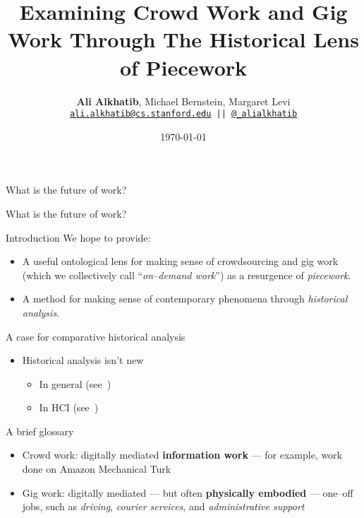 \documentclass{beamer}
\title{Examining Crowd Work and Gig Work Through The Historical Lens of Piecework}
\author{\textbf{Ali Alkhatib},
                Michael Bernstein,
                Margaret Levi\\
\texttt{ \scriptsize{\href{mailto:ali.alkhatib@cs.stanford.edu}{ali.alkhatib@cs.stanford.edu} ||
         \href{http://twitter.com/_alialkhatib}{@\_alialkhatib}} }}
\institute[Stanford]{Stanford University}
\date{\today}
\newcommand{\onlyinsubfile}[1]{#1}
\begin{document}
\renewcommand{\onlyinsubfile}[1]{}
\begin{frame}
\titlepage
\end{frame}




\begin{frame}[standout]
    What is the future of work?
\end{frame}

\begin{frame}{What is the future of work?}
    
\end{frame}

\begin{frame}{Introduction}
  We hope to provide:
      \begin{itemize}
        \item A useful ontological lens for making sense of crowdsourcing and gig work (which we collectively call ``\textit{on--demand work}'') as a resurgence of \textit{piecework}.
        \item A method for making sense of contemporary phenomena through \textit{historical analysis}.
      \end{itemize}
\end{frame}

\begin{frame}{A case for comparative historical analysis}
\begin{itemize}
  \item Historical analysis isn't new
  \begin{itemize}
    \item In general (see~\textcite{rosenberg1994exploring,rosenberg1982inside})
    \item In HCI (see~\textcite{Wyche2006,bodker1993historical})
  \end{itemize}
\end{itemize}
\end{frame}

\begin{frame}{A brief glossary}
    \begin{itemize}
      \item Crowd work: digitally mediated \textbf{information work}
      --- for example, work done on Amazon Mechanical Turk~\cite{crowdworkFuture}
      \item Gig work: digitally mediated --- but often \textbf{physically embodied} --- one--off jobs,
      such as
      \textit{driving},
      \textit{courier services},
      and \textit{administrative support}~\cite{friedman2014workers,Parigi:2016:GE:3026779.3013496}
    \end{itemize}
\end{frame}



% 
% 
% 


% 
\printbibliography{}
\end{document}
